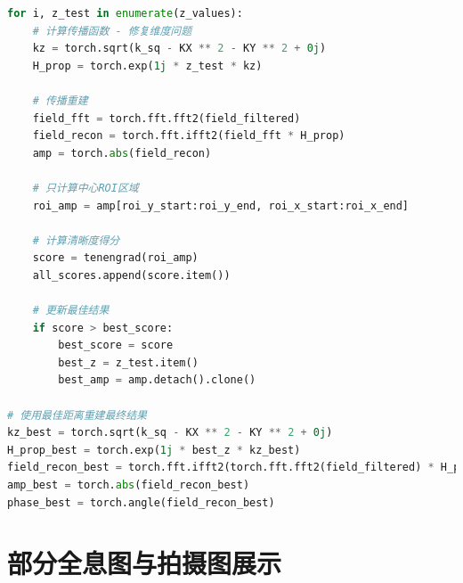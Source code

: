 \documentclass[a4paper,draft]{report}
\begin{document}
\begin{lstlisting}[language=Python, caption=离轴全息重建, label=code:generator]
for i, z_test in enumerate(z_values):
    # 计算传播函数 - 修复维度问题
    kz = torch.sqrt(k_sq - KX ** 2 - KY ** 2 + 0j)
    H_prop = torch.exp(1j * z_test * kz)

    # 传播重建
    field_fft = torch.fft.fft2(field_filtered)
    field_recon = torch.fft.ifft2(field_fft * H_prop)
    amp = torch.abs(field_recon)

    # 只计算中心ROI区域
    roi_amp = amp[roi_y_start:roi_y_end, roi_x_start:roi_x_end]

    # 计算清晰度得分
    score = tenengrad(roi_amp)
    all_scores.append(score.item())

    # 更新最佳结果
    if score > best_score:
        best_score = score
        best_z = z_test.item()
        best_amp = amp.detach().clone()

# 使用最佳距离重建最终结果
kz_best = torch.sqrt(k_sq - KX ** 2 - KY ** 2 + 0j)
H_prop_best = torch.exp(1j * best_z * kz_best)
field_recon_best = torch.fft.ifft2(torch.fft.fft2(field_filtered) * H_prop_best)
amp_best = torch.abs(field_recon_best)
phase_best = torch.angle(field_recon_best)
\end{lstlisting}

\section{部分全息图与拍摄图展示}
\end{document}
